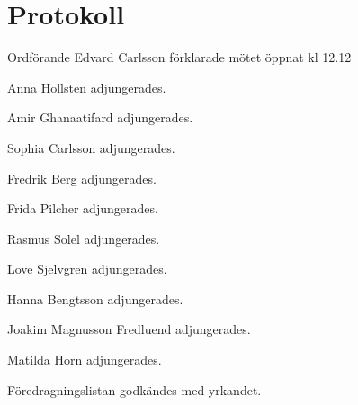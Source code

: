 \documentclass[10pt]{article}
\def\mo{Edvard Carlsson}
\begin{document}
\section*{Protokoll}
\begin{paragrafer}
Ordförande {\mo} förklarade mötet öppnat kl 12.12

{\valavmo}

{\valavms}

{\valavj}

{\tosg}


Anna Hollsten adjungerades. 

Amir Ghanaatifard adjungerades.

Sophia Carlsson adjungerades.

Fredrik Berg adjungerades.

Frida Pilcher adjungerades.

Rasmus Solel adjungerades.

Love Sjelvgren adjungerades.

Hanna Bengtsson adjungerades. 

Joakim Magnusson Fredluend adjungerades.

Matilda Horn adjungerades.




Föredragningslistan godkändes med yrkandet.



\end{paragrafer}
\end{document}
